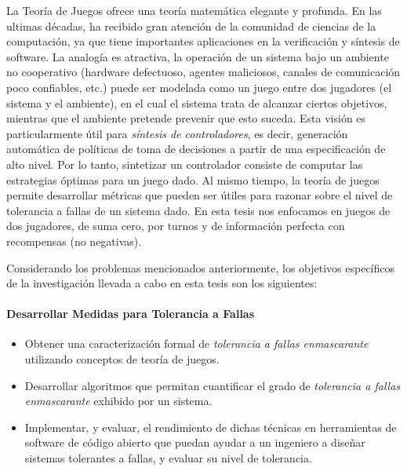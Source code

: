 La Teoría de Juegos \cite{MorgensternNeuman42} ofrece una teoría matemática elegante y profunda. 
En las ultimas décadas, ha recibido gran atención de la comunidad de ciencias de la computación, ya que tiene importantes aplicaciones en la verificación y síntesis de software. 
La analogía es atractiva, la operación de un sistema bajo un ambiente no cooperativo (hardware defectuoso, agentes maliciosos, canales de comunicación poco confiables, etc.) puede ser modelada como un juego entre dos jugadores (el sistema y el ambiente), en el cual el sistema trata de alcanzar ciertos objetivos, mientras que el ambiente pretende prevenir que esto suceda. 
Esta visión es particularmente útil para \textit{síntesis de controladores}, es decir, generación automática de políticas de toma de decisiones a partir de una especificación de alto nivel. 
Por lo tanto, sintetizar un controlador consiste de computar las estrategias óptimas para un juego dado. Al mismo tiempo, la teoría de juegos permite desarrollar métricas que pueden ser útiles para razonar sobre el nivel de tolerancia a fallas de un sistema dado.
En esta tesis nos enfocamos en juegos de dos jugadores, de suma cero, por turnos y de información perfecta con recompensas (no negativas)\cite{FilarV96}. 

Considerando los problemas mencionados anteriormente, los objetivos específicos de la investigación llevada a cabo en esta tesis son los siguientes:

\paragraph{Desarrollar Medidas para Tolerancia a Fallas}
\begin{itemize}
\item Obtener una caracterización formal de \textit{tolerancia a fallas enmascarante} utilizando conceptos de teoría de juegos.
    
\item Desarrollar algoritmos que permitan cuantificar el grado de \textit{tolerancia a fallas enmascarante} exhibido por un sistema.

\item Implementar, y evaluar, el rendimiento de dichas técnicas en herramientas de software de código abierto que puedan ayudar a un ingeniero a diseñar sistemas tolerantes a fallas, y evaluar su nivel de tolerancia.
\end{itemize}

